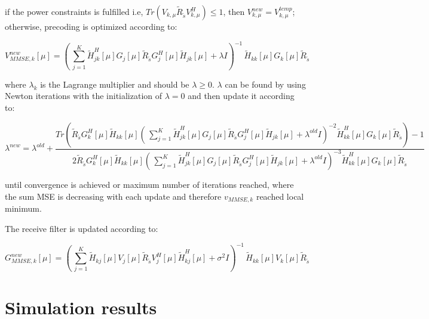 \documentclass[12pt,a4paper,notitlepage,twoside,headsepline]{scrartcl}
\begin{document}
if the power constraints is fulfilled i.e, $Tr(V_{k,\mu}\tilde{R}_{\tilde{s}}V_{k,\mu}^H) \leq 1$, then $ V_{k,\mu}^{new} = V_{k,\mu}^{temp}$; otherwise, precoding is optimized according to:

\begin{equation}
	V_{MMSE, k}^{new}[\mu] = ( \, \sum_{j=1}^{K}{\tilde{H}_{jk}^{H}[\mu] G_j[\mu] \tilde{R}_{\tilde{s}} G_j^H[\mu] \tilde{H}_{jk}[\mu] + \lambda I})^{-1} \, \tilde{H}_{kk}[\mu] G_k[\mu] \tilde{R}_{\tilde{s}}
\end{equation}

where $\lambda_k $ is the Lagrange multiplier and should be $ \lambda \geq 0 $. $\lambda$ can be found by using Newton iterations with the initialization of $ \lambda = 0 $ and then update it according to:

\begin{equation}
	\lambda^{new} = \lambda^{old} + \frac{Tr( \tilde{R}_{\tilde{s}} G_k^H[\mu] \tilde{H}_{kk}[\mu] ( \, \sum_{j=1}^{K}{\tilde{H}_{jk}^{H}[\mu] G_j[\mu] \tilde{R}_{\tilde{s}} G_j^H[\mu] \tilde{H}_{jk}[\mu] + \lambda^{old} I})^{-2} \tilde{H}_{kk}^H [\mu] G_k[\mu] \tilde{R}_{\tilde{s}}) - 1}{2 \tilde{R}_{\tilde{s}} G_k^H[\mu] \tilde{H}_{kk}[\mu] ( \, \sum_{j=1}^{K}{\tilde{H}_{jk}^{H}[\mu] G_j[\mu] \tilde{R}_{\tilde{s}} G_j^H[\mu] \tilde{H}_{jk}[\mu] + \lambda^{old} I})^{-3} \tilde{H}_{kk}^H [\mu] G_k[\mu] \tilde{R}_{\tilde{s}}}
\end{equation}

until convergence is achieved or maximum number of iterations reached, where the sum MSE is decreasing with each update and therefore $v_{MMSE,k}$ reached local minimum.

The receive filter is updated according to:

\begin{equation}
	G_{MMSE, k}^{new}[\mu] = ( \, \sum_{j=1}^{K}{\tilde{H}_{kj}[\mu] V_j[\mu] \tilde{R}_{\tilde{s}} V_j^H[\mu] \tilde{H}_{kj}^H[\mu] + \sigma^2 I})^{-1} \, \tilde{H}_{kk}[\mu] V_k[\mu] \tilde{R}_{\tilde{s}}
\end{equation}

\section{Simulation results}



\end{document}
